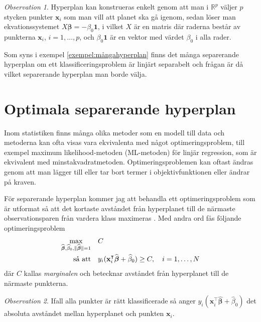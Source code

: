 \documentclass[a4paper, 12pt]{report}
\theoremstyle{definition}
\theoremstyle{remark}
\newtheorem*{rem}{Observation}
\newcommand{\bfbeta}{{\boldsymbol{\beta}}}
\begin{document}
\begin{rem}
	Hyperplan kan konstrueras enkelt genom att man i $\mathbb{R}^p$ väljer $p$ stycken punkter $\mathbf{x}_i$ som man vill att planet ska gå igenom, sedan löser man ekvationssystemet $X\bfbeta=-\beta_0\mathbf{1}$, i vilket $X$ är en matris där raderna består av punkterna $\mathbf{x}_i$, $i=1,\dots, p$, och $\beta_0\mathbf{1}$ är en vektor med värdet $\beta_0$ i alla rader.
\end{rem}

Som syns i exempel \ref{exempel:mångahyperplan} finns det många separerande hyperplan om ett klassificeringsproblem är linjärt separabelt och frågan är då vilket separerande hyperplan man borde välja.

\section{Optimala separerande hyperplan}
Inom statistiken finns många olika metoder som en modell till data och metoderna kan ofta visas vara ekvivalenta med något optimeringsproblem, till exempel maximum likelihood-metoden (ML-metoden) för linjär regression, som är ekvivalent med minstakvadratmetoden. %
Optimeringsproblemen kan oftast ändras genom att man lägger till eller tar bort termer i objektivfunktionen eller ändrar på kraven.

För separerande hyperplan kommer jag att behandla ett optimeringsproblem som är utformat så att det kortaste avståndet från hyperplanet till de närmaste observationsparen från vardera klass maximeras \cite{Vapnik96}. Med andra ord fås följande optimeringsproblem
\begin{equation}\label{opt:optimalmargin1}
\begin{aligned}
	 \operatornamewithlimits{max}_{\widehat{\bfbeta},\widehat{\beta}_0,\|\widehat{\bfbeta}\|=1}& & &C\\
	 \text{så att}& & &y_i(\mathbf{x}_i^\intercal\widehat{\bfbeta}+\widehat{\beta}_0)\geq C,\quad i=1,\dots,N
\end{aligned}
\end{equation}
där $C$ kallas \emph{marginalen} och betecknar avståndet från hyperplanet till de närmaste punkterna.
\begin{rem}
	Ifall alla punkter är rätt klassificerade så anger $y_i(\mathbf{x}^\intercal_i\widehat{\bfbeta}+\widehat{\beta}_0)$ det absoluta avståndet mellan hyperplanet och punkten $\mathbf{x}_i$.
\end{rem}
\end{document}
